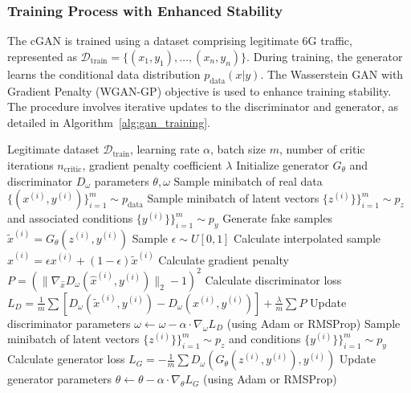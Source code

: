 \documentclass{article}
\begin{document}
\subsubsection{Training Process with Enhanced Stability}
The cGAN is trained using a dataset comprising legitimate 6G traffic, represented as $\mathcal{D}_{\mathrm{train}} = \{(x_1, y_1), \dots, (x_n, y_n)\}$. During training, the generator learns the conditional data distribution $p_{\mathrm{data}}(x|y)$. The Wasserstein GAN with Gradient Penalty (WGAN-GP) objective \cite{Arifin2024ASOF} is used to enhance training stability. The procedure involves iterative updates to the discriminator and generator, as detailed in Algorithm~\ref{alg:gan_training}.

\begin{algorithm}
\caption{cGAN Training with WGAN-GP}
\label{alg:gan_training}
\begin{algorithmic}[1]
\Require Legitimate dataset \(\mathcal{D}_{\mathrm{train}}\), learning rate \(\alpha\), batch size \(m\), number of critic iterations \(n_{\mathrm{critic}}\), gradient penalty coefficient \(\lambda\)
\State Initialize generator \(G_\theta\) and discriminator \(D_\omega\) parameters \(\theta, \omega\)
        \State Sample minibatch of real data \(\{(x^{(i)}, y^{(i)})\}_{i=1}^m \sim p_{\mathrm{data}}\)
        \State Sample minibatch of latent vectors \(\{z^{(i)}\}\}_{i=1}^m \sim p_z\) and associated conditions \(\{y^{(i)}\}\}_{i=1}^m \sim p_y\)
        \State Generate fake samples \(\tilde{x}^{(i)} = G_\theta(z^{(i)}, y^{(i)})\)
        \State Sample \(\epsilon \sim U[0, 1]\)
        \State Calculate interpolated sample \(\hat{x}^{(i)} = \epsilon x^{(i)} + (1-\epsilon) \tilde{x}^{(i)}\)
        \State Calculate gradient penalty \( P = (\|\nabla_{\hat{x}} D_\omega(\hat{x}^{(i)}, y^{(i)})\|_2 - 1)^2 \)
        \State Calculate discriminator loss \( L_D = \frac{1}{m}\sum [D_\omega(\tilde{x}^{(i)}, y^{(i)}) - D_\omega(x^{(i)}, y^{(i)})] + \frac{\lambda}{m}\sum P \)
        \State Update discriminator parameters \( \omega \leftarrow \omega - \alpha \cdot \nabla_\omega L_D \) (using Adam or RMSProp)
    \EndFor
    \State Sample minibatch of latent vectors \(\{z^{(i)}\}\}_{i=1}^m \sim p_z\) and conditions \(\{y^{(i)}\}\}_{i=1}^m \sim p_y\)
    \State Calculate generator loss \( L_G = -\frac{1}{m}\sum D_\omega(G_\theta(z^{(i)}, y^{(i)}), y^{(i)}) \)
    \State Update generator parameters \( \theta \leftarrow \theta - \alpha \cdot \nabla_\theta L_G \) (using Adam or RMSProp)
\EndWhile
\end{algorithmic}
\end{algorithm}
\end{document}

